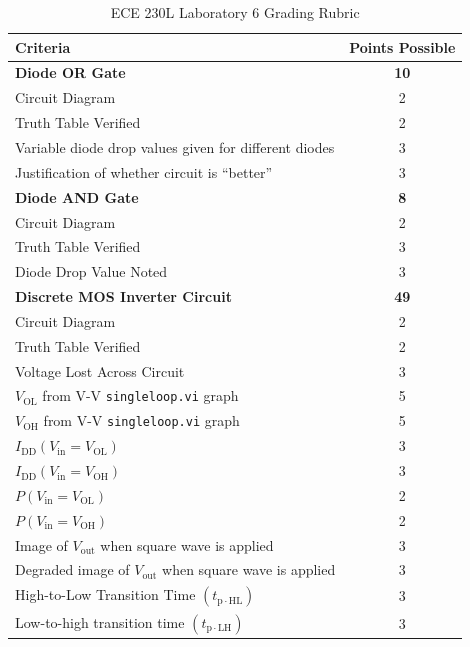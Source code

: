 \documentclass[12pt]{../manual}
\begin{document}
%
\newpage
\def\arraystretch{1.2}
{}
\hspace{0pt}
\vfill %
\begin{table}[ht!]
\caption{ECE 230L Laboratory 6 Grading Rubric}
\centering
\begin{tabular}{l|c} \hline
Criteria & Points Possible \\ \hline \hline
\textbf{Diode OR Gate}			& \textbf{10} \\
Circuit Diagram 				& 2 \\
Truth Table Verified			& 2 \\
Variable diode drop values given for different diodes & 3 \\
Justification of whether circuit is ``better'' & 3 \\ \hline
\textbf{Diode AND Gate}			& \textbf{8} \\
Circuit Diagram 				& 2 \\
Truth Table Verified			& 3 \\
Diode Drop Value Noted			& 3 \\ \hline
\textbf{Discrete MOS Inverter Circuit}		& \textbf{49} \\
Circuit Diagram 				& 2 \\
Truth Table Verified			& 2 \\
Voltage Lost Across Circuit 	& 3 \\
$V_\mathrm{OL}$ from V-V {\tt singleloop.vi} graph 	& 5 \\
$V_\mathrm{OH}$ from V-V {\tt singleloop.vi} graph	& 5 \\
$I_\mathrm{DD}(V_\mathrm{in} = V_\mathrm{OL})$ & 3 \\
$I_\mathrm{DD}(V_\mathrm{in} = V_\mathrm{OH})$ & 3 \\
$P(V_\mathrm{in} = V_\mathrm{OL})$ & 2 \\
$P(V_\mathrm{in} = V_\mathrm{OH})$ & 2 \\
Image of $V_\mathrm{out}$ when square wave is applied & 3 \\
Degraded image of $V_\mathrm{out}$ when square wave is applied & 3 \\
High-to-Low Transition Time $(t_\mathrm{p \cdot HL})$ & 3 \\
Low-to-high transition time $(t_\mathrm{p \cdot LH})$ & 3 \\

\end{tabular}
\end{table}
\end{document}

